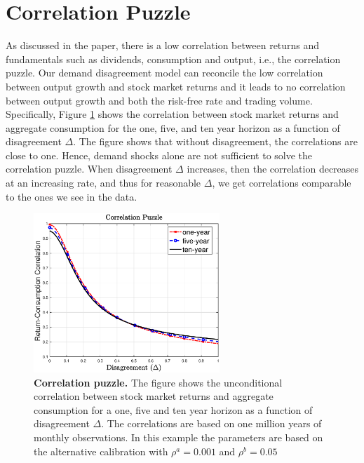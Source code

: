 \section{Correlation Puzzle}
As discussed in the paper, there is a low correlation between returns and fundamentals such as dividends, consumption and output, i.e., the correlation puzzle.  Our demand disagreement model can reconcile the low correlation between output growth and stock market returns and it leads to no correlation between   output growth and both the risk-free rate and trading volume. Specifically, Figure \ref{fig:CorrelationPuzzle} shows the correlation between stock market returns and aggregate consumption for the one, five, and ten year horizon as a function of disagreement $\Delta$.  The figure shows that without disagreement, the correlations are close to one. Hence, demand shocks alone are not sufficient to solve the correlation puzzle.  When disagreement $\Delta$ increases, then the correlation decreases at an increasing rate, and thus for reasonable $\Delta$, we get correlations comparable to the ones we see in the data.  

\begin{figure}[H]
\begin{center}
       \includegraphics[height=6cm]{figures/CorrelationPuzzle2DEL.eps}  
     \captionsetup{labelformat=andtable}
     \end{center}
\renewcommand\thetable{1}
\caption{\textbf{Correlation puzzle.} \footnotesize{The figure shows the unconditional correlation between stock market returns and aggregate consumption for a one, five and ten year horizon as a function of disagreement $\Delta$. The correlations are based on one million years of monthly observations. In this example the parameters are based on the alternative calibration with $\rho^a = 0.001$ and $\rho^b = 0.05$ }} \label{fig:CorrelationPuzzle} 
\end{figure}

